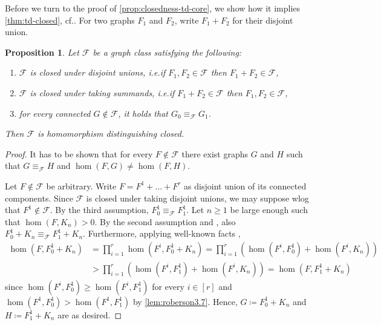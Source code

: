 \documentclass[10pt,a4paper]{article}
\newtheorem{proposition}[theorem]{Proposition}
\begin{document}
Before we turn to the proof of \cref{prop:closedness-td-core}, we show how it implies \cref{thm:td-closed}, cf.\@ \cite[Theorem~4.7]{roberson_oddomorphisms_2022}. For two graphs $F_1$ and $F_2$, write $F_1 + F_2$ for their disjoint union.

\begin{proposition} \label{prop:closed-core}
	Let $\mathcal{F}$ be a graph class satisfying the following:
	\begin{enumerate}
		\item $\mathcal{F}$ is closed under disjoint unions, i.e.\@ if $F_1, F_2 \in \mathcal{F}$ then $F_1 + F_2 \in \mathcal{F}$,
		\item $\mathcal{F}$ is closed under taking summands, i.e.\@ if $F_1 + F_2 \in \mathcal{F}$ then $F_1, F_2 \in \mathcal{F}$,
		\item for every connected $G \not\in \mathcal{F}$, it holds that $G_0 \equiv_{\mathcal{F}} G_1$.
	\end{enumerate}
	Then $\mathcal{F}$ is homomorphism distinguishing closed.
\end{proposition}
\begin{proof}
	 It has to be shown that for every $F \not\in \mathcal{F}$ there exist graphs $G$ and $H$ such that
	 $G \equiv_{\mathcal{F}} H$ and $\hom(F, G) \neq \hom(F, H)$.
	 
	 Let $F \not\in \mathcal{F}$ be arbitrary. Write $F = F^1 + \dots + F^r$ as disjoint union of its connected components. Since $\mathcal{F}$ is closed under taking disjoint unions, we may suppose wlog that $F^1 \not\in \mathcal{F}$.
	 By the third assumption, $F^1_0 \equiv_{\mathcal{F}} F^1_1$.
	 Let $n \geq 1$ be large enough such that $\hom(F, K_n) > 0$.
	 By the second assumption and \cite[Theorem~5]{seppelt_logical_2023}, also $F^1_0 + K_n \equiv_{\mathcal{F}} F^1_1 + K_n$. Furthermore, applying well-known facts \cite[(5.28)--(5.30)]{lovasz_large_2012},
	 \begin{align*}
	 	\hom(F, F^1_0 + K_n) 
	 	&= \prod_{i = 1}^r \hom(F^i, F^1_0 + K_n)
	 	= \prod_{i = 1}^r \left(\hom(F^i, F^1_0) + \hom(F^i, K_n)\right) \\
	 	& > \prod_{i = 1}^r \left(\hom(F^i, F^1_1) + \hom(F^i, K_n)\right) = \hom(F, F^1_1 + K_n)
	 \end{align*}
 	since $\hom(F^i, F^1_0) \geq \hom(F^i, F^1_1)$ for every $i \in [r]$ and $\hom(F^1, F^1_0) > \hom(F^1, F^1_1)$ by \cref{lem:roberson3.7}.
 	Hence, $G \coloneqq F^1_0 + K_n$ and $H \coloneqq F^1_1 + K_n$ are as desired.
\end{proof}
\end{document}

